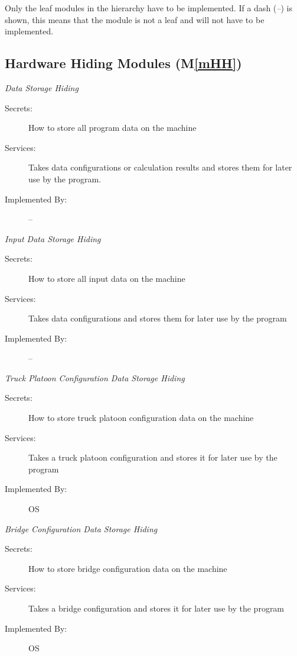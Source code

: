 \documentclass[12pt, titlepage]{article}
\newcommand{\mref}[1]{M\ref{#1}}
\begin{document}
Only the leaf modules in the hierarchy have to be implemented. If a dash
(\emph{--}) is shown, this means that the module is not a leaf and will not have
to be implemented.

\subsection{Hardware Hiding Modules (\mref{mHH})}
\emph{{\large Data Storage Hiding}}
    \begin{description}
        \item[Secrets:] How to store all program data on the machine
        \item[Services:]Takes data configurations or calculation results and stores them for later use by the program.
        \item[Implemented By:] -- \\
    \end{description}
    \emph{{\large Input Data Storage Hiding}}
    \begin{description}
        \item[Secrets:] How to store all input data on the machine
        \item[Services:] Takes data configurations and stores them for later use by the program
        \item[Implemented By:] -- \\
    \end{description}
    \emph{{\large Truck Platoon Configuration Data Storage Hiding}}
    \begin{description}
        \item[Secrets:] How to store truck platoon configuration data on the machine
        \item[Services:]Takes a truck platoon configuration and stores it for later use by the program
        \item[Implemented By:] OS\\
    \end{description}
    \emph{{\large Bridge Configuration Data Storage Hiding}}
    \begin{description}
        \item[Secrets:] How to store bridge configuration data on the machine
        \item[Services:]Takes a bridge configuration and stores it for later use by the program
        \item[Implemented By:] OS\\
    \end{description}
\end{document}
